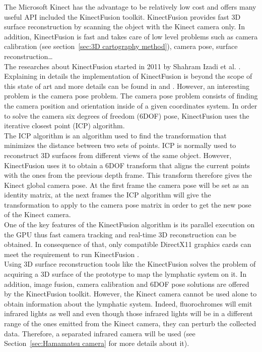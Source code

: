 The Microsoft Kinect has the advantage to be relatively low cost and offers many useful API included the KinectFusion toolkit. KinectFusion provides fast 3D surface reconstruction by scanning the object with the Kinect camera only. In addition, KinectFusion is fast and takes care of low level problems such as camera calibration (see section~\ref{sec:3D cartography method}), camera pose, surface reconstruction\ldots \\

The researches about KinectFusion started in 2011 by Shahram Izadi et al. \cite{izadi_kinectfusion:_2011}. Explaining in details the implementation of KinectFusion is beyond the scope of this state of art and more details can be found in \cite{newcombe_kinectfusion:_2011} and \cite{izadi_kinectfusion:_2011}. However, an interesting problem is the camera pose problem. The camera pose problem consists of finding the camera position and orientation inside of a given coordinates system. In order to solve the camera six degrees of freedom (6DOF) pose, KinectFusion uses the iterative closest point (ICP) algorithm.\\

The ICP algorithm is an algorithm used to find the transformation that minimizes the distance between two sets of points. ICP is normally used to reconstruct 3D surfaces from different views of the same object. However, KinectFusion uses it to obtain a 6DOF transform that aligns the current points with the ones from the previous depth frame. This transform therefore gives the Kinect global camera pose. At the first frame the camera pose will be set as an identity matrix, at the next frames the ICP algorithm will give the transformation to apply to the camera pose matrix in order to get the new pose of the Kinect camera.\\

One of the key features of the KinectFusion algorithm is its parallel execution \cite{izadi_kinectfusion:_2011} on the GPU thus fast camera tracking and real-time 3D reconstruction can be obtained. In consequence of that, only compatible DirectX11 graphics cards can meet the requirement to run KinectFusion \cite{kinect}.\\

Using 3D surface reconstruction tools like the KinectFusion solves the problem of acquiring a 3D surface of the prototype to map the lymphatic system on it.  In addition, image fusion, camera calibration and 6DOF pose solutions are offered by the KinectFusion toolkit. However, the Kinect camera cannot be used alone to obtain information about the lymphatic system. Indeed, fluorochromes will emit infrared lights as well and even though those infrared lights will be in a different range of the ones emitted from the Kinect camera, they can perturb the collected data. Therefore, a separated infrared camera will be used (see Section~\ref{sec:Hamamatsu camera} for more details about it).

